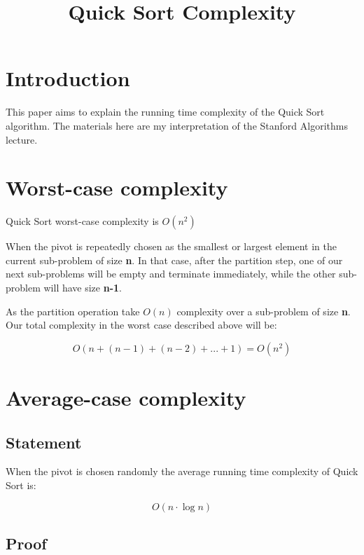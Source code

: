 \documentclass{article}
\title{Quick Sort Complexity}
\date{}
\begin{document}
\maketitle

\section{Introduction}

This paper aims to explain the running time complexity of the Quick Sort algorithm. The materials here are my interpretation of the Stanford Algorithms lecture.

\section{Worst-case complexity}

Quick Sort worst-case complexity is $O(n^2)$

\bigskip

\noindent When the pivot is repeatedly chosen as the smallest or largest element in the current sub-problem of size \textbf{n}. In that case, after the partition step, one of our next sub-problems will be empty and terminate immediately, while the other sub-problem will have size \textbf{n-1}.

\bigskip

\noindent As the partition operation take $O(n)$ complexity over a sub-problem of size \textbf{n}. Our total complexity in the worst case described above  will be:

\begin{equation*}
O(n + (n-1) + (n-2) + ... + 1) = O(n^2)
\end{equation*}

\section{Average-case complexity}

\subsection{Statement}

When the pivot is chosen randomly the average running time complexity of Quick Sort is:

\begin{equation*}
O(n \cdot \log n)
\end{equation*}

\subsection{Proof}
\end{document}

